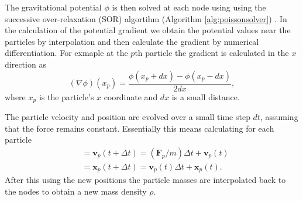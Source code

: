 \documentclass[notitlepage, 12pt]{article}
\begin{document}
The gravitational potential $\phi$ is then solved at each node using using the successive over-relaxation (SOR) algortihm (Algorithm \ref{alg:poissonsolver}) . In the calculation of the potential gradient we obtain the potential values near the particles by interpolation and then calculate the gradient by numerical differentiation. For exmaple at the $p$th particle the gradient is calculated in the $x$ direction as
\begin{equation}
(\nabla \phi)(x_p)=\frac{\phi(x_p+dx)-\phi(x_p-dx)}{2dx},
\end{equation}
where $x_p$ is the particle's $x$ coordinate and $dx$ is a small distance.  

The particle velocity and position are evolved over a small time step $dt$, assuming that the force remains constant. Essentially this means calculating for each particle
\begin{align}
&=\mathbf{v}_p(t+\Delta t) = (\mathbf{F}_p/m)\Delta t + \mathbf{v}_p(t)\\
&=\mathbf{x}_p(t+\Delta t) = \mathbf{v}_p(t)\Delta t + \mathbf{x}_p(t).
\end{align}
After this using the new positions the particle masses are interpolated back to the nodes to obtain a new mass density $\rho$.
\end{document}
